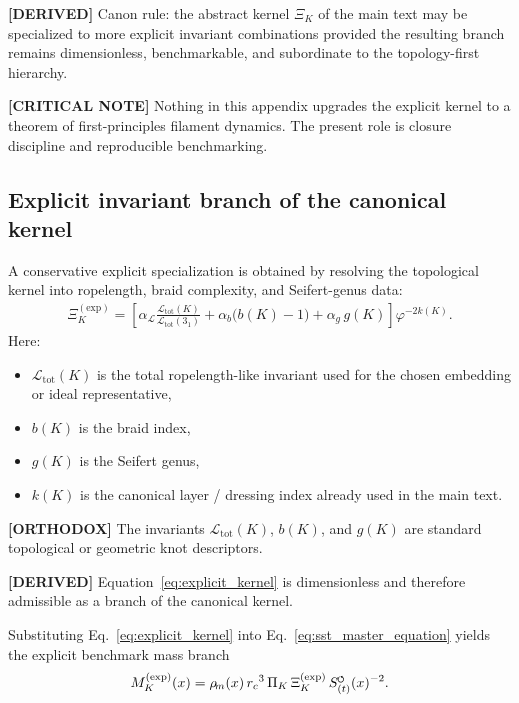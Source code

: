 \documentclass[11pt]{article}
\theoremstyle{definition}
\theoremstyle{plain}
\theoremstyle{remark}
\newcommand{\swirlarrow}{\mathchoice{\mkern-2mu\scriptstyle\boldsymbol{\circlearrowleft}}{\mkern-2mu\scriptstyle\boldsymbol{\circlearrowleft}}{\mkern-2mu\scriptscriptstyle\boldsymbol{\circlearrowleft}}{\mkern-2mu\scriptscriptstyle\boldsymbol{\circlearrowleft}}}
\newcommand{\rhoM}{\rho_{\!m}}
\newcommand{\SwirlClock}{{S_{(t)}^{\swirlarrow}}}
\newcommand{\rc}{{r_c}}
\begin{document}
        \textbf{[DERIVED]} Canon rule: the abstract kernel \(\Xi_K\) of the main text may be specialized to more explicit invariant combinations provided the resulting branch remains dimensionless, benchmarkable, and subordinate to the topology-first hierarchy.
        
        \textbf{[CRITICAL NOTE]} Nothing in this appendix upgrades the explicit kernel to a theorem of first-principles filament dynamics. The present role is closure discipline and reproducible benchmarking.
    
    \subsection{Explicit invariant branch of the canonical kernel}
        A conservative explicit specialization is obtained by resolving the topological kernel into ropelength, braid complexity, and Seifert-genus data:
        \begin{align}
            \Xi_K^{(\mathrm{exp})}
            =
            \left[
                \alpha_{\mathcal{L}}
                \frac{\mathcal{L}_{\mathrm{tot}}(K)}{\mathcal{L}_{\mathrm{tot}}(3_1)}
                +
                \alpha_b \bigl(b(K)-1\bigr)
            +
                \alpha_g\, g(K)
            \right]
            \varphi^{-2k(K)}.
            \label{eq:explicit_kernel}
        \end{align}
        Here:
        \begin{itemize}
            \item \(\mathcal{L}_{\mathrm{tot}}(K)\) is the total ropelength-like invariant used for the chosen embedding or ideal representative,
            \item \(b(K)\) is the braid index,
            \item \(g(K)\) is the Seifert genus,
            \item \(k(K)\) is the canonical layer / dressing index already used in the main text.
        \end{itemize}
        
        \textbf{[ORTHODOX]} The invariants \(\mathcal{L}_{\mathrm{tot}}(K)\), \(b(K)\), and \(g(K)\) are standard topological or geometric knot descriptors.
        
        \textbf{[DERIVED]} Equation~\eqref{eq:explicit_kernel} is dimensionless and therefore admissible as a branch of the canonical kernel.
        
        Substituting Eq.~\eqref{eq:explicit_kernel} into Eq.~\eqref{eq:sst_master_equation} yields the explicit benchmark mass branch
        \begin{align}
            M_K^{(\mathrm{exp})}(x)
            =
            \rhoM(x)\,\rc^3\,\Pi_K\,\Xi_K^{(\mathrm{exp})}\,\SwirlClock(x)^{-2}.
            \label{eq:explicit_mass_branch}
        \end{align}
    
\end{document}

